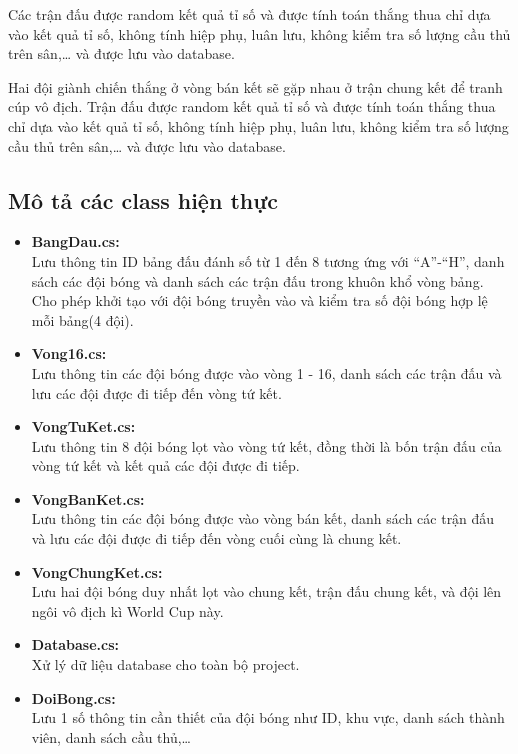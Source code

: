 \documentclass[a4paper]{article}
\begin{document}
Các trận đấu được random kết quả tỉ số và được tính toán thắng thua chỉ dựa vào kết quả tỉ số, không tính hiệp phụ, luân lưu, không kiểm tra số lượng cầu thủ trên sân,… và được lưu vào database.

Hai đội giành chiến thắng ở vòng bán kết sẽ gặp nhau ở trận chung kết để tranh cúp vô địch. Trận đấu được random kết quả tỉ số và được tính toán thắng thua chỉ dựa vào kết quả tỉ số, không tính hiệp phụ, luân lưu, không kiểm tra số lượng cầu thủ trên sân,… và được lưu vào database.
\subsection{Mô tả các class hiện thực}
\begin{itemize}
\item \textbf{BangDau.cs:} \\
Lưu thông tin ID bảng đấu đánh số từ 1 đến 8 tương ứng với “A”-“H”, danh sách các đội bóng và danh sách các trận đấu trong khuôn khổ vòng bảng.\\
Cho phép khởi tạo với đội bóng truyền vào và kiểm tra số đội bóng hợp lệ mỗi bảng(4 đội).
\item \textbf{Vong16.cs:}\\
Lưu thông tin các đội bóng được vào vòng 1 - 16, danh sách các trận đấu và lưu các đội được đi tiếp đến vòng tứ kết.\\
\item \textbf{VongTuKet.cs:}\\
Lưu thông tin 8 đội bóng lọt vào vòng tứ kết, đồng thời là bốn trận đấu của vòng tứ kết và kết quả các đội được đi tiếp.\\
\item \textbf{VongBanKet.cs:}\\
Lưu thông tin các đội bóng được vào vòng bán kết, danh sách các trận đấu và lưu các đội được đi tiếp đến vòng cuối cùng là chung kết.\\
\item \textbf{VongChungKet.cs:}\\
Lưu hai đội bóng duy nhất lọt vào chung kết, trận đấu chung kết, và đội lên ngôi vô địch kì World Cup này.\\
\item \textbf{Database.cs:}\\
Xử lý dữ liệu database cho toàn bộ project.
\item \textbf{DoiBong.cs:}\\
Lưu 1 số thông tin cần thiết của đội bóng như ID, khu vực, danh sách thành viên, danh sách cầu thủ,…

\end{itemize}
\end{document}
